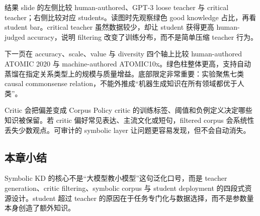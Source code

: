 结果 slide 的左侧比较 human-authored、GPT-3 loose teacher 与 critical teacher；右侧比较对应 students。读图时先观察绿色 good knowledge 占比，再看 student bar。critical teacher 虽然数据较少，却让 student 获得更高 human-judged accuracy，说明 filtering 改变了训练分布，而不是简单压缩 teacher 行为。


下一页在 accuracy、scale、value 与 diversity 四个轴上比较 human-authored ATOMIC 2020 与 machine-authored ATOMIC10x。绿色柱整体更高，支持自动蒸馏在指定关系类型上的规模与质量增益。底部限定非常重要：实验聚焦七类 causal commonsense relation，不能外推成“机器生成知识在所有领域都优于人类”。


\begin{warningbox}{Critic 会把偏差变成 Corpus Policy}
critic 的训练标签、阈值和负例定义决定哪些知识被保留。若 critic 偏好常见表达、主流文化或短句，filtered corpus 会系统性丢失少数观点。可审计的 symbolic layer 让问题更容易发现，但不会自动消失。
\end{warningbox}

\subsection{本章小结}

Symbolic KD 的核心不是“大模型教小模型”这句泛化口号，而是 teacher generation、critic filtering、symbolic corpus 与 student deployment 的四段式资源设计。student 超过 teacher 的原因在于任务专门化与数据选择，而不是参数量本身创造了额外知识。

